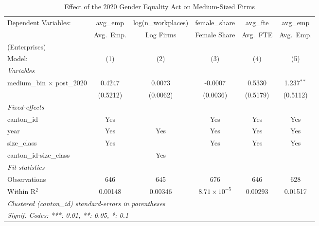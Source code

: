 
\begin{table}[htbp]
   \caption{\label{tab:main_did} Effect of the 2020 Gender Equality Act on Medium-Sized Firms}
   \centering
   \footnotesize
   \begin{tabular}{lccccc}
      \tabularnewline \midrule \midrule
      Dependent Variables:               & avg\_emp    & log(n\_workplaces)  & female\_share         & avg\_fte   & avg\_emp\\   
                                         & Avg.\ Emp.  & Log Firms           & Female Share          & Avg.\ FTE  & Avg.\ Emp.\\(Enterprises) \\      
      Model:                             & (1)         & (2)                 & (3)                   & (4)        & (5)\\  
      \midrule
      \emph{Variables}\\
      medium\_bin $\times$ post\_2020    & 0.4247      & 0.0073              & -0.0007               & 0.5330     & 1.237$^{**}$\\   
                                         & (0.5212)    & (0.0062)            & (0.0036)              & (0.5179)   & (0.5112)\\   
      \midrule
      \emph{Fixed-effects}\\
      canton\_id                         & Yes         &                     & Yes                   & Yes        & Yes\\  
      year                               & Yes         & Yes                 & Yes                   & Yes        & Yes\\  
      size\_class                        & Yes         &                     & Yes                   & Yes        & Yes\\  
      canton\_id-size\_class             &             & Yes                 &                       &            & \\  
      \midrule
      \emph{Fit statistics}\\
      Observations                       & 646         & 645                 & 676                   & 646        & 628\\  
      Within R$^2$                       & 0.00148     & 0.00346             & $8.71\times 10^{-5}$  & 0.00293    & 0.01517\\  
      \midrule \midrule
      \multicolumn{6}{l}{\emph{Clustered (canton\_id) standard-errors in parentheses}}\\
      \multicolumn{6}{l}{\emph{Signif. Codes: ***: 0.01, **: 0.05, *: 0.1}}\\
   \end{tabular}
   

\end{table}
